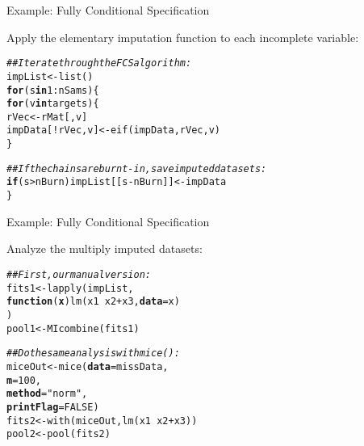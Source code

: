 \documentclass{beamer}\usepackage[]{graphicx}\usepackage[]{color}
\makeatletter
\newcommand{\hlnum}[1]{\textcolor[rgb]{0.69,0.494,0}{#1}}%
\newcommand{\hlstr}[1]{\textcolor[rgb]{0.749,0.012,0.012}{#1}}%
\newcommand{\hlcom}[1]{\textcolor[rgb]{0.514,0.506,0.514}{\textit{#1}}}%
\newcommand{\hlopt}[1]{\textcolor[rgb]{0,0,0}{#1}}%
\newcommand{\hlstd}[1]{\textcolor[rgb]{0,0,0}{#1}}%
\newcommand{\hlkwa}[1]{\textcolor[rgb]{0,0,0}{\textbf{#1}}}%
\newcommand{\hlkwb}[1]{\textcolor[rgb]{0,0.341,0.682}{#1}}%
\newcommand{\hlkwc}[1]{\textcolor[rgb]{0,0,0}{\textbf{#1}}}%
\newcommand{\hlkwd}[1]{\textcolor[rgb]{0.004,0.004,0.506}{#1}}%
\newenvironment{kframe}{%
 \def\at@end@of@kframe{}%
 \ifinner\ifhmode%
  \def\at@end@of@kframe{\end{minipage}}%
  \begin{minipage}{\columnwidth}%
 \fi\fi%
 \def\FrameCommand##1{\hskip\@totalleftmargin \hskip-\fboxsep
 \colorbox{shadecolor}{##1}\hskip-\fboxsep
     \hskip-\linewidth \hskip-\@totalleftmargin \hskip\columnwidth}%
 \MakeFramed {\advance\hsize-\width
   \@totalleftmargin\z@ \linewidth\hsize
   \@setminipage}}%
 {\par\unskip\endMakeFramed%
 \at@end@of@kframe}
\newenvironment{knitrout}{}{} %
\makeatother
\begin{document}
\begin{frame}[fragile]{Example: Fully Conditional Specification}
  
  Apply the elementary imputation function to each incomplete variable:
  
\begin{knitrout}\footnotesize
{}\color{fgcolor}\begin{kframe}
\begin{alltt}
\hlcom{## Iterate through the FCS algorithm:}
\hlstd{impList} \hlkwb{<-} \hlkwd{list}\hlstd{()}
\hlkwa{for}\hlstd{(s} \hlkwa{in} \hlnum{1} \hlopt{:} \hlstd{nSams) \{}
    \hlkwa{for}\hlstd{(v} \hlkwa{in} \hlstd{targets) \{}
        \hlstd{rVec}              \hlkwb{<-} \hlstd{rMat[ , v]}
        \hlstd{impData[}\hlopt{!}\hlstd{rVec, v]} \hlkwb{<-} \hlkwd{eif}\hlstd{(impData, rVec, v)}
    \hlstd{\}}

    \hlcom{## If the chains are burnt-in, save imputed datasets:}
    \hlkwa{if}\hlstd{(s} \hlopt{>} \hlstd{nBurn) impList[[s} \hlopt{-} \hlstd{nBurn]]} \hlkwb{<-} \hlstd{impData}
\hlstd{\}}
\end{alltt}
\end{kframe}
\end{knitrout}

\end{frame}


\begin{frame}[fragile]{Example: Fully Conditional Specification}
  
  Analyze the multiply imputed datasets:

\begin{knitrout}\footnotesize
{}\color{fgcolor}\begin{kframe}
\begin{alltt}
\hlcom{## First, our manual version:}
\hlstd{fits1} \hlkwb{<-} \hlkwd{lapply}\hlstd{(impList,}
                \hlkwa{function}\hlstd{(}\hlkwc{x}\hlstd{)} \hlkwd{lm}\hlstd{(x1} \hlopt{~} \hlstd{x2} \hlopt{+} \hlstd{x3,} \hlkwc{data} \hlstd{= x)}
                \hlstd{)}
\hlstd{pool1} \hlkwb{<-} \hlkwd{MIcombine}\hlstd{(fits1)}

\hlcom{## Do the same analysis with mice():}
\hlstd{miceOut} \hlkwb{<-} \hlkwd{mice}\hlstd{(}\hlkwc{data}      \hlstd{= missData,}
                \hlkwc{m}         \hlstd{=} \hlnum{100}\hlstd{,}
                \hlkwc{method}    \hlstd{=} \hlstr{"norm"}\hlstd{,}
                \hlkwc{printFlag} \hlstd{=} \hlnum{FALSE}\hlstd{)}
\hlstd{fits2} \hlkwb{<-} \hlkwd{with}\hlstd{(miceOut,} \hlkwd{lm}\hlstd{(x1} \hlopt{~} \hlstd{x2} \hlopt{+} \hlstd{x3))}
\hlstd{pool2} \hlkwb{<-} \hlkwd{pool}\hlstd{(fits2)}
\end{alltt}
\end{kframe}
\end{knitrout}

\end{frame}
\end{document}
